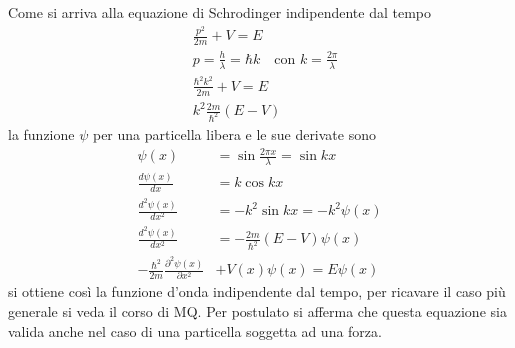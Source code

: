 Come si arriva alla equazione di Schrodinger indipendente dal tempo
\begin{equation}
\begin{split}
& \frac{ p^2}{2m } + V = E \\
& p = \frac{ h}{\lambda } = \hbar k \quad \mbox{con } k = \frac{ 2\pi}{\lambda } \\
& \frac{ \hbar^2 k^2}{2m } + V = E \\
& k^2 \frac{ 2m}{\hbar^2 } (E-V)
\end{split}
\end{equation}
la funzione $\psi$ per una particella libera e le sue derivate sono
\begin{equation}
\begin{split}
\psi(x) & = \sin\frac{2\pi x}{\lambda } = \sin kx \\
\frac{ d \psi(x)}{dx } & = k \cos kx \\
\frac{ d^2 \psi(x)}{dx^2 } & = -k^2 \sin kx = -k^2 \psi(x) \\
\frac{ d^2 \psi(x)}{dx^2 } & = -\frac{ 2m}{\hbar^2 } (E-V) \psi(x) \\
-\frac{\hbar^2}{2m} \frac{\partial^2 \psi(x)}{\partial x^2} & + V(x)\psi(x) = E\psi(x)
\end{split}
\end{equation}
si ottiene così la funzione d'onda indipendente dal tempo, per ricavare il caso più generale si veda il corso di MQ.
Per postulato si afferma che questa equazione sia valida anche nel caso di una particella soggetta ad una forza.


